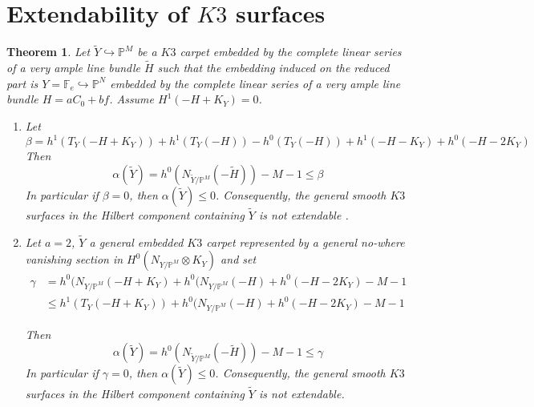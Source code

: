 \documentclass[11pt,twoside]{amsart}
\theoremstyle{plain}
\numberwithin{equation}{section}
\newtheorem{theorem}{Theorem}[section]
\theoremstyle{definition}
\begin{document}
\section{Extendability of $K3$ surfaces}





\begin{theorem}\label{ZL for K3 carpets}
 Let $\widetilde{Y} \hookrightarrow \mathbb{P}^M$ be a $K3$ carpet embedded by the complete linear series of a very ample line bundle $\widetilde{H}$ such that the embedding induced on the reduced part is $Y = \mathbb{F}_e \hookrightarrow \mathbb{P}^N$ embedded by the complete linear series of a very ample line bundle $H = aC_0+bf$. Assume $H^1(-H+K_Y) = 0$. 
 
 \begin{enumerate}
 \item Let $$\beta = h^1(T_Y(-H+K_Y)) + h^1(T_Y(-H)) - h^0(T_Y(-H)) +  h^1(-H-K_Y) + h^0(-H-2K_Y)$$ 
Then 
$$\alpha(\widetilde{Y}) = h^0(N_{\widetilde{Y}/\mathbb{P}^M}(-\widetilde{H}))-M-1 \leq  \beta$$ 
In particular if $\beta = 0$, then $\alpha(\widetilde{Y}) \leq 0$. Consequently, the general smooth $K3$ surfaces in the Hilbert component containing $\widetilde{Y}$ is not extendable .

\item Let $a = 2$, $\widetilde{Y}$ a general embedded $K3$ carpet represented by a general no-where vanishing section in $H^0(N_{Y/\mathbb{P}^M} \otimes K_Y)$ and set
\begin{align*}
    \gamma & =  h^0(N_{Y/\mathbb{P}^M}(-H+K_Y)+h^0(N_{Y/\mathbb{P}^M}(-H)+h^0(-H-2K_Y)-M-1 \\
    & \leq h^1(T_Y(-H+K_Y))+h^0(N_{Y/\mathbb{P}^M}(-H)+h^0(-H-2K_Y)-M-1
\end{align*}

Then 
$$\alpha(\widetilde{Y}) = h^0(N_{\widetilde{Y}/\mathbb{P}^M}(-\widetilde{H}))-M-1 \leq  \gamma$$ 
In particular if $\gamma = 0$, then $\alpha(\widetilde{Y}) \leq 0$. Consequently, the general smooth $K3$ surfaces in the Hilbert component containing $\widetilde{Y}$ is not extendable.


\end{enumerate}
\end{theorem}
\end{document}
